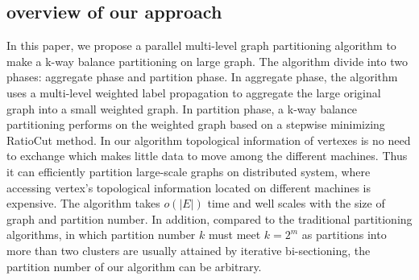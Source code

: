 \documentclass{acm_proc_article-sp}
\begin{document}
\subsection{ overview of our approach}
In this paper, we propose a parallel multi-level graph partitioning algorithm to make a k-way balance partitioning on large graph. The algorithm divide into two phases: aggregate phase and partition phase. In aggregate phase, the algorithm uses a multi-level weighted label propagation to aggregate the large original graph into a small weighted graph. In partition phase, a k-way balance partitioning performs on the weighted graph based on a stepwise minimizing RatioCut method. In our algorithm topological information of vertexes is no need to exchange which makes little data to move among the different machines. Thus it can efficiently partition large-scale graphs on distributed system, where accessing vertex's topological information located on different machines is expensive. The algorithm takes $o(|E|)$ time and well scales with the size of graph and partition number. In addition, compared to the traditional partitioning algorithms, in which partition number $k$ must meet $k=2^m$ as partitions into more than two clusters are usually attained by iterative bi-sectioning, the partition number of our algorithm can be arbitrary.
\end{document}

